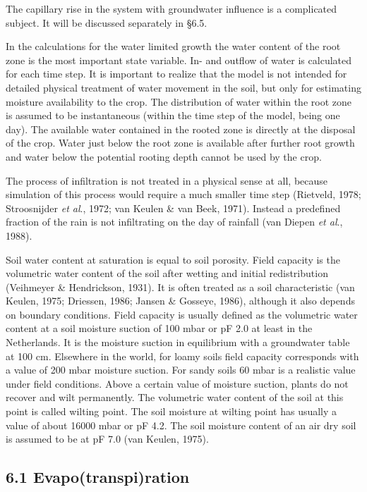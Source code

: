 \documentclass[11pt]{article}
\begin{document}
The capillary rise in the system with groundwater influence is a complicated subject. It
will be discussed separately in \S 6.5.

In the calculations for the water limited growth the water content of the root zone is the
most important state variable. In- and outflow of water is calculated for each time step. It
is important to realize that the model is not intended for detailed physical treatment of
water movement in the soil, but only for estimating moisture availability to the crop. The
distribution of water within the root zone is assumed to be instan\-taneous (within the time
step of the model, being one day). The available water contained in the rooted zone is
directly at the disposal of the crop. Water just below the root zone is available after
further root growth and water below the potential rooting depth cannot be used by the
crop.

The process of infiltration is not treated in a physical sense at all, because simulation of
this process would require a much smaller time step (Rietveld, 1978; Stroosnijder {\it et al\/}.,
1972; van Keulen \& van Beek, 1971). Instead a predefined fraction of the rain is not
infiltrating on the day of rainfall (van Diepen {\it et al\/}., 1988).

Soil water content at saturation is equal to soil porosity. Field capacity is the volumetric
water content of the soil after wetting and initial redistribution (Veihmeyer \& Hendrick\-son, 1931). It is often treated as a soil characteristic (van Keulen, 1975; Driessen, 1986;
Jansen \& Gosseye, 1986), although it also depends on boundary conditions. Field capacity
is usually defined as the volumetric  water content at a soil moisture suction of 100 mbar
or pF 2.0 at least in the Netherlands. It is the moisture suction in equilibrium with a
groundwater table at 100 cm. Elsewhere in the world, for loamy soils field capacity
corresponds with a value of 200 mbar moisture suction. For sandy soils 60 mbar is a
realistic value under field conditions. Above a certain value of moisture suction, plants do
not recover and wilt permanently. The volumetric water content of the soil at this point is
called wilting point. The soil moisture at wilting point has usually a value of about 16000
mbar or pF 4.2. The soil moisture content of an air dry soil is assumed to be at pF 7.0
(van Keulen, 1975).

\newpage

\subsection{  6.1 Evapo(transpi)ration  }
\end{document}

